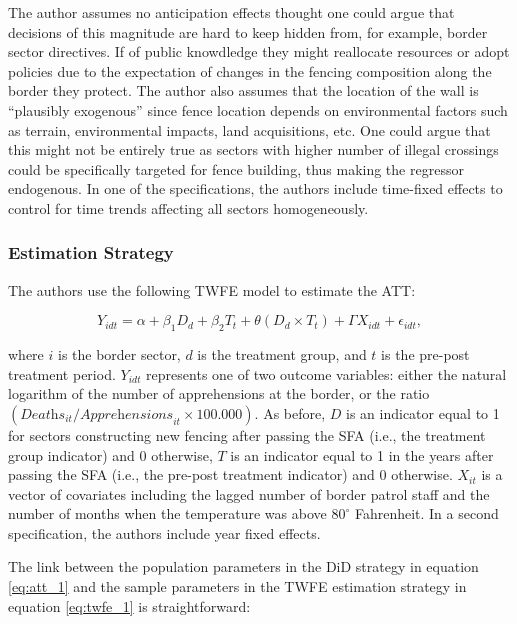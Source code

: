 \documentclass[titlepage]{article}
\theoremstyle{plain}
\theoremstyle{plain}
\begin{document}
The author assumes no anticipation effects thought one could argue that decisions of this magnitude are hard to keep hidden from, for example, border sector directives. If of public knowdledge they might reallocate resources or adopt policies due to the expectation of changes in the fencing composition along the border they protect. The author also assumes that the location of the wall is \enquote{plausibly exogenous} since fence location depends on environmental factors such as terrain, environmental impacts, land acquisitions, etc. One could argue that this might not be entirely true as sectors with higher number of illegal crossings could be specifically targeted for fence building, thus making the regressor endogenous. In one of the specifications, the authors include time-fixed effects to control for time trends affecting all sectors homogeneously.


\subsubsection*{Estimation Strategy}

The authors use the following TWFE model to estimate the ATT:

\begin{equation}
	\label{eq:twfe_1}
    Y_{idt} = \alpha + \beta_{1}\textit{D}_{d} + \beta_{2}\textit{T}_{t} + \theta(\textit{D}_{d} \times \textit{T}_{t}) + \Gamma X_{idt} + \epsilon_{idt},
\end{equation}

\noindent where $i$ is the border sector, $d$ is the treatment group, and $t$ is the pre-post treatment period. $Y_{idt}$ represents one of two outcome variables: either the natural logarithm of the number of apprehensions at the border, or the ratio $(\textit{Deaths}_{it}/\textit{Apprehensions}_{it} \times 100.000)$. As before, $D$ is an indicator equal to 1 for sectors constructing new fencing after passing the SFA (i.e., the treatment group indicator) and 0 otherwise, $T$ is an indicator equal to 1 in the years after passing the SFA (i.e., the pre-post treatment indicator) and 0 otherwise. $X_{it}$ is a vector of covariates including the lagged number of border patrol staff and the number of months when the temperature was above $80^{\circ}$ Fahrenheit. In a second specification, the authors include year fixed effects.

The link between the population parameters in the DiD strategy in equation \ref{eq:att_1} and the sample parameters in the TWFE estimation strategy in equation \ref{eq:twfe_1} is straightforward:
\end{document}
